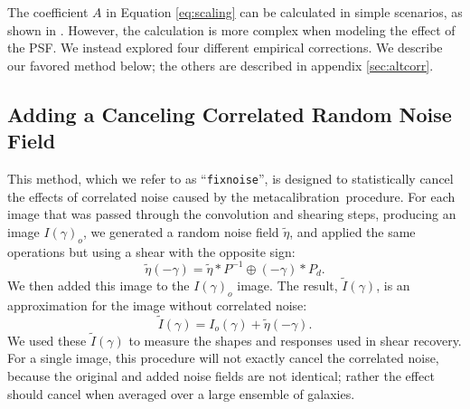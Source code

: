 \documentclass[usegraphicx,usenatbib]{mn2e}
\newcommand{\mcal}{metacalibration}
\newcommand{\mcalR}{$R$}
\newcommand{\fixnoise}{\texttt{fixnoise}}
\begin{document}
The coefficient $A$ in Equation \ref{eq:scaling} can be calculated in simple
scenarios, as shown in \cite{HirataCorrNoise}.  However, the calculation is
more complex when modeling the effect of the PSF.  We instead explored four
different empirical corrections.  We describe our favored method
below; the others are described in appendix \ref{sec:altcorr}.

\subsection{Adding a Canceling Correlated Random Noise Field} \label{sec:fixnoise}

This method, which we refer to as ``\fixnoise'', is designed to statistically
cancel the effects of correlated noise caused by the \mcal\ procedure.  For each
image that was passed through the convolution and shearing steps, producing
an image $I(\gamma)_o$, we generated a random noise field
$\tilde{\eta}$, and applied the same operations but using a shear with
the opposite sign:
\begin{equation}
    \tilde{\eta}(-\gamma) = \tilde{\eta} \ast P^{-1} \oplus (-\gamma) \ast P_{d}.
\end{equation}
We then added this image to the $I(\gamma)_o$ image.
The result, $\tilde{I}(\gamma)$, is an approximation for the image
without correlated noise:
\begin{equation}
    \tilde{I}(\gamma) = I_o(\gamma) + \tilde{\eta}(-\gamma).
\end{equation}
We used these $\tilde{I}(\gamma)$ to measure the shapes and responses used in
shear recovery.  For a single image, this procedure will not exactly cancel the
correlated noise, because the original and added noise fields are not
identical; rather the effect should cancel when averaged over a large ensemble
of galaxies.
\end{document}
